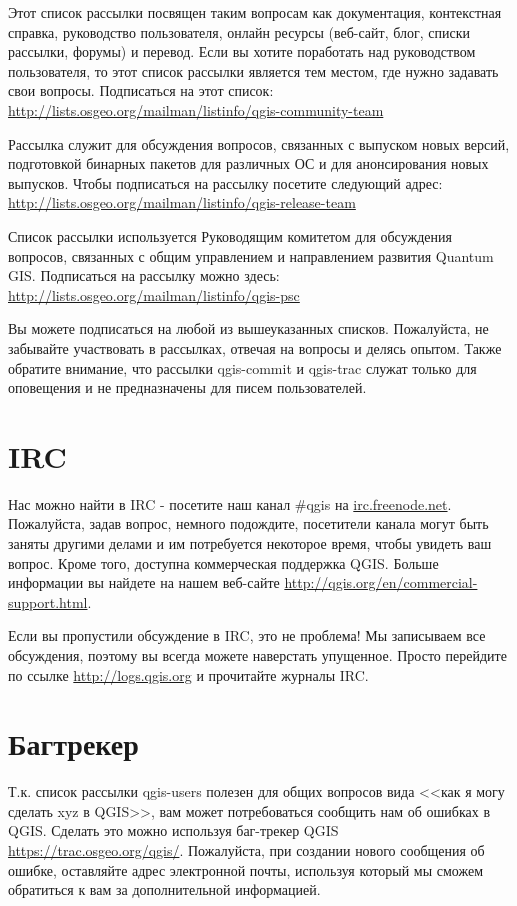 Этот список рассылки посвящен таким вопросам как документация,
контекстная справка, руководство пользователя, онлайн ресурсы (веб-сайт,
блог, списки рассылки, форумы) и перевод. Если вы хотите поработать над
руководством пользователя, то этот список рассылки является тем местом,
где нужно задавать свои вопросы. Подписаться на этот список: \\
\url{http://lists.osgeo.org/mailman/listinfo/qgis-community-team}

Рассылка служит для обсуждения вопросов, связанных с выпуском новых
версий, подготовкой бинарных пакетов для различных ОС и для
анонсирования новых выпусков. Чтобы подписаться на рассылку посетите
следующий адрес:\\
\url{http://lists.osgeo.org/mailman/listinfo/qgis-release-team}

Список рассылки используется Руководящим комитетом для обсуждения
вопросов, связанных с общим управлением и направлением развития Quantum
GIS. Подписаться на рассылку можно здесь:\\
\url{http://lists.osgeo.org/mailman/listinfo/qgis-psc}

Вы можете подписаться на любой из вышеуказанных списков. Пожалуйста, не
забывайте участвовать в рассылках, отвечая на вопросы и делясь опытом.
Также обратите внимание, что рассылки qgis-commit и qgis-trac служат
только для оповещения и не предназначены для писем пользователей.

\section{IRC}
Нас можно найти в IRC - посетите наш канал \#qgis на
\url{irc.freenode.net}. Пожалуйста, задав вопрос, немного подождите,
посетители канала могут быть заняты другими делами и им потребуется
некоторое время, чтобы увидеть ваш вопрос. Кроме того, доступна
коммерческая поддержка QGIS. Больше информации вы найдете на нашем
веб-сайте \url{http://qgis.org/en/commercial-support.html}.

Если вы пропустили обсуждение в IRC, это не проблема! Мы записываем все
обсуждения, поэтому вы всегда можете наверстать упущенное. Просто
перейдите по ссылке \url{http://logs.qgis.org} и прочитайте журналы IRC.

\section{Багтрекер}
Т.к. список рассылки qgis-users полезен для общих вопросов вида <<как я
могу сделать xyz в QGIS>>, вам может потребоваться сообщить нам об
ошибках в QGIS. Сделать это можно используя баг-трекер QGIS
\url{https://trac.osgeo.org/qgis/}. Пожалуйста, при создании нового
сообщения об ошибке, оставляйте адрес электронной почты, используя
который мы сможем обратиться к вам за дополнительной информацией.

